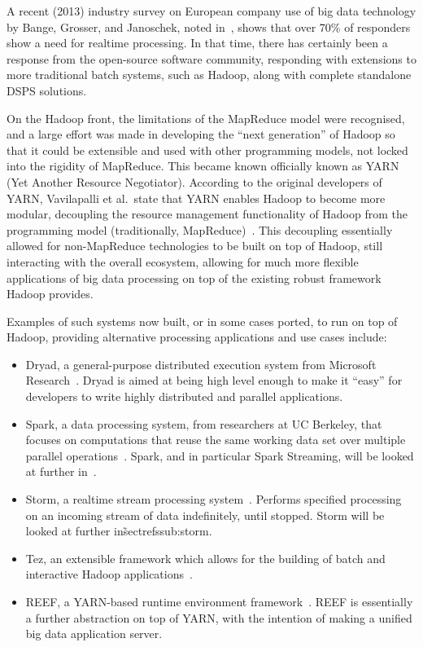 \documentclass[a4paper,11pt]{article}
\begin{document}
A recent (2013) industry survey on European company use of big data technology by Bange, Grosser, and Janoschek, noted
in~\cite{industry_bd_survey}, shows that over 70\% of responders show a need for realtime processing. In that time,
there has certainly been a response from the open-source software community, responding with extensions to more
traditional batch systems, such as Hadoop, along with complete standalone DSPS solutions.

On the Hadoop front, the limitations of the MapReduce model were recognised, and a large effort was made in developing
the ``next generation'' of Hadoop so that it could be extensible and used with other programming models, not locked into
the rigidity of MapReduce. This became known officially known as YARN (Yet Another Resource Negotiator). According to
the original developers of YARN, Vavilapalli et al.\ state that YARN enables Hadoop to become more modular, decoupling
the resource management functionality of Hadoop from the programming model (traditionally, MapReduce)~\cite{vavilapalli2013apache}.
This decoupling essentially allowed for non-MapReduce technologies to be built on top of Hadoop, still interacting with the
overall ecosystem, allowing for much more flexible applications of big data processing on top of the existing robust
framework Hadoop provides.

Examples of such systems now built, or in some cases ported, to run on top of Hadoop, providing alternative processing
applications and use cases include:

\begin{itemize}
  \item Dryad, a general-purpose distributed execution system from Microsoft Research~\cite{isard2007dryad}. Dryad is
  aimed at being high level enough to make it ``easy'' for developers to write highly distributed and parallel applications.
  \item Spark, a data processing system, from researchers at UC Berkeley, that focuses on computations that reuse the same working data set over multiple
  parallel operations~\cite{zaharia2010spark}. Spark, and in particular Spark Streaming, will be looked at further in~.
  \item Storm, a realtime stream processing system~\cite[p.\ 244]{murthy2013apache}. Performs specified processing on an
  incoming stream of data indefinitely, until stopped. Storm will be looked at further in\~sectref{ssub:storm}.
  \item Tez, an extensible framework which allows for the building of batch and interactive Hadoop applications~\cite{web_tez}.
  \item REEF, a YARN-based runtime environment framework~\cite{chun2013reef}. REEF is essentially a further abstraction
  on top of YARN, with the intention of making a unified big data application server.
\end{itemize}
\end{document}
